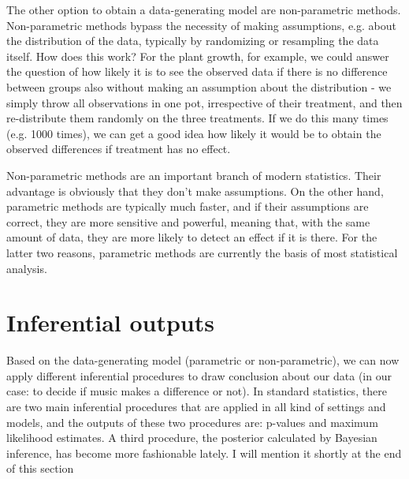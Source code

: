 \documentclass[a4paper,twoside]{tufte-book}\usepackage[]{graphicx}\usepackage[]{color}
\begin{document}
{The other option to obtain a data-generating model are non-parametric methods. Non-parametric methods bypass the necessity of making assumptions, e.g. about the distribution of the data, typically by randomizing or resampling the data itself. How does this work? For the plant growth, for example, we could answer the question of how likely it is to see the observed data if there is no difference between groups also without making an assumption about the distribution - we simply throw all observations in one pot, irrespective of their treatment, and then re-distribute them randomly on the three treatments. If we do this many times (e.g. 1000 times), we can get a good idea how likely it would be to obtain the observed differences if treatment has no effect. 

Non-parametric methods are an important branch of modern statistics. Their advantage is obviously that they don't make assumptions. On the other hand, parametric methods are typically much faster, and if their assumptions are correct, they are more sensitive and powerful, meaning that, with the same amount of data, they are more likely to detect an effect if it is there. For the latter two reasons, parametric methods are currently the basis of most statistical analysis.


\section{Inferential outputs}

Based on the data-generating model (parametric or non-parametric), we can now apply different inferential procedures to draw conclusion about our data (in our case: to decide if music makes a difference or not). In standard statistics, there are two main inferential procedures that are applied in all kind of settings and models, and the outputs of these two procedures are: p-values and maximum likelihood estimates. A third procedure, the posterior calculated by Bayesian inference, has become more fashionable lately. I will mention it shortly at the end of this section 

}
\end{document}
